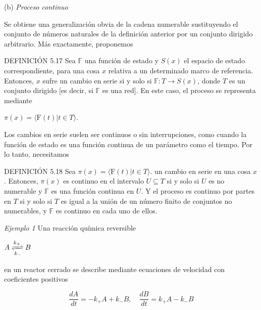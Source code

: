 \begin{justifying}
    \noindent(b) \textit{Proceso continuo}
    \medskip

    \noindent Se obtiene una generalización obvia de la cadena numerable sustituyendo el conjunto de números naturales de la definición anterior por un conjunto dirigido arbitrario. Más exactamente, proponemos
    
    \noindent DEFINICIÓN 5.17 Sea $\mathbb{F}$ una función de estado y $S(x)$ el espacio de estado correspondiente, para una cosa $x$ relativa a un determinado marco de referencia. Entonces, $x$ sufre un cambio en 
    serie si y solo si $\mathbb{F}:T \to S(x)$, donde $T$ es un conjunto dirigido [es decir, si $\mathbb{F}$ es una red]. En este caso, el proceso se representa mediante

    \indent\indent$\pi(x) = \langle \text{F}(t) | t \in T \rangle.$

    Los cambios en serie suelen ser continuos o sin interrupciones, como cuando la función de estado es una función continua de un parámetro como el tiempo. Por lo tanto, necesitamos

    DEFINICIÓN 5.18 Sea $\pi(x) = \langle \text{F}(t) | t \in T \rangle.$ un cambio en serie en una cosa $x$. Entonces, $\pi(x)$ es continuo en el intervalo $U \subseteq T$ si y solo si $U$ es no numerable y $\mathbb{F}$ es una función continua en $U$. Y el proceso es continuo por partes en $T$ si y solo si $T$ es igual a la unión de un 
    número finito de conjuntos no numerables, y $\mathbb{F}$ es continuo en cada uno de ellos.

    \textit{Ejemplo 1} Una reacción química reversible

    \indent\indent\indent $A \xrightleftharpoons[k_-]{k_+} B$

    \noindent en un reactor cerrado se describe mediante ecuaciones de velocidad con coeficientes positivos

    \[\frac{dA}{dt} = -k_+A + k_-B, \quad \frac{dB}{dt} = k_+A - k_-B\]


\end{justifying}
